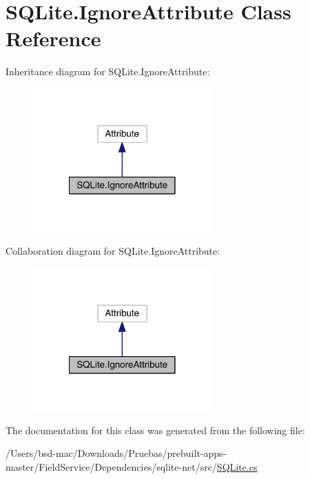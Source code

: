\hypertarget{class_s_q_lite_1_1_ignore_attribute}{\section{S\+Q\+Lite.\+Ignore\+Attribute Class Reference}
\label{class_s_q_lite_1_1_ignore_attribute}
}


Inheritance diagram for S\+Q\+Lite.\+Ignore\+Attribute\+:
\nopagebreak
\begin{figure}[H]
\begin{center}
\leavevmode
\includegraphics[width=194pt]{class_s_q_lite_1_1_ignore_attribute__inherit__graph}
\end{center}
\end{figure}


Collaboration diagram for S\+Q\+Lite.\+Ignore\+Attribute\+:
\nopagebreak
\begin{figure}[H]
\begin{center}
\leavevmode
\includegraphics[width=194pt]{class_s_q_lite_1_1_ignore_attribute__coll__graph}
\end{center}
\end{figure}


The documentation for this class was generated from the following file\+:\begin{DoxyCompactItemize}
\item 
/\+Users/bsd-\/mac/\+Downloads/\+Pruebas/prebuilt-\/apps-\/master/\+Field\+Service/\+Dependencies/sqlite-\/net/src/\hyperlink{_s_q_lite_8cs}{S\+Q\+Lite.\+cs}\end{DoxyCompactItemize}
